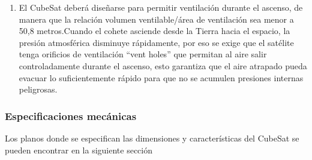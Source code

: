 \documentclass[12pt]{article}
\begin{document}
\begin{enumerate}
		\item El CubeSat deberá diseñarse para permitir ventilación durante el ascenso, de manera que la relación volumen ventilable/área de ventilación sea menor a 50,8 metros.Cuando el cohete asciende desde la Tierra hacia el espacio, la presión atmosférica disminuye rápidamente, por eso se exige que el satélite tenga orificios de ventilación “vent holes” que permitan al aire salir controladamente durante el ascenso, esto garantiza que el aire atrapado pueda evacuar lo suficientemente rápido para que no se acumulen presiones internas peligrosas.
		
	\end{enumerate}
	
	\subsubsection{Especificaciones mecánicas}
	Los planos donde se especifican las dimensiones y características del CubeSat se pueden encontrar en la siguiente sección \cite{CDSDrawings2022}
	
\end{document}
